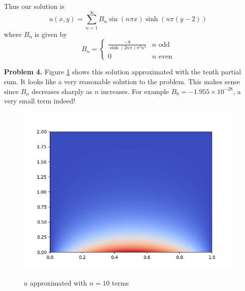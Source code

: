 \documentclass[12pt]{article}
\newcommand{\problem}[1]{\hspace{-4 ex} \large \textbf{Problem #1} }
\begin{document}
Thus our solution is
$$
u(x,y) = \sum\limits_{n=1}^\infty B_n\sin( n\pi x ) \sinh( n\pi(y - 2))
$$
where $B_n$ is given by
$$
B_n = \begin{cases}
	\frac{-8}{\sinh( 2 n\pi) \pi^3 n^3} & n \text{ odd} \\
	0 & n \text{ even}
\end{cases}
$$

\problem{4. } Figure \ref{fig1} shows this solution approximated with the tenth partial sum. It looks like a very reasonable solution to the problem. This makes sense since $B_n$ decreases sharply as $n$ increases. For example $B_9 = -1.955\times 10^{-28}$, a very small term indeed!

\begin{figure}[H]
	\caption{$u$ approximated with $n=10$ terms}
	\includegraphics[width=1\textwidth]{tk02_figure1_png}
	\label{fig1}
	\centering
\end{figure}
\end{document}
